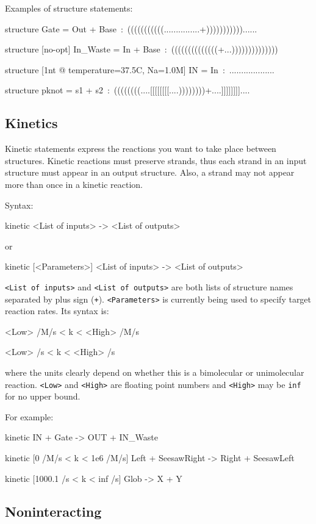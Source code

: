 \documentclass{article}
\newenvironment{code}
{\vspace{-0.1in}\par\begin{list}{}{
\setlength{\listparindent}{0pt}
\raggedright
\setlength{\itemsep}{0pt}
\setlength{\parsep}{0pt}
\normalfont\ttfamily}
 \item[]}
{\end{list}\vspace{-0.1in}}
\begin{document}
Examples of structure statements:
\begin{code}
structure Gate = Out + Base~:~(((((((((((...............+)))))))))))......

structure [no-opt] In\_Waste = In + Base~:~((((((((((((((+...))))))))))))))

structure [1nt \textsf{@} temperature=37.5C, Na=1.0M] IN = In~:~...................

structure pknot = s1 + s2~:~((((((((....[[[[[[[[....))))))))+....]]]]]]]]....
\end{code}

\subsection{Kinetics}

Kinetic statements express the reactions you want to take place between
structures. Kinetic reactions must preserve strands, thus each strand
in an input structure must appear in an output structure. Also, a
strand may not appear more than once in a kinetic reaction.

Syntax:
\begin{code}
kinetic <List of inputs> -> <List of outputs>
\end{code}
or
\begin{code}
kinetic [<Parameters>] <List of inputs> -> <List of outputs>
\end{code}
\texttt{<List of inputs>} and \texttt{<List of outputs>} are both lists of structure
names separated by plus sign (\texttt{+}). \texttt{<Parameters>} is currently being
used to specify target reaction rates. Its syntax is:
\begin{code}
<Low> /M/s < k < <High> /M/s

<Low> /s < k < <High> /s
\end{code}
where the units clearly depend on whether this is a bimolecular or
unimolecular reaction. \texttt{<Low>} and \texttt{<High>} are floating point numbers
and \texttt{<High>} may be \texttt{inf} for no upper bound.

For example:
\begin{code}
kinetic IN + Gate -> OUT + IN\_Waste

kinetic [0 /M/s < k < 1e6 /M/s] Left + SeesawRight -> Right + SeesawLeft

kinetic [1000.1 /s < k < inf /s] Glob -> X + Y
\end{code}

\subsection{Noninteracting}
\end{document}
